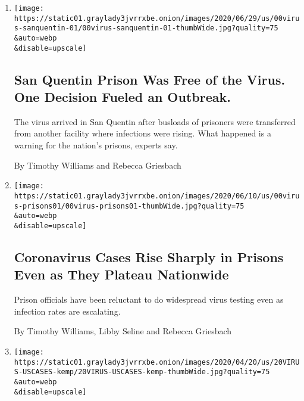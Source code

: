 \begin{enumerate}
\def\labelenumi{\arabic{enumi}.}
\item
  \href{/2020/06/30/us/san-quentin-prison-coronavirus.html}{}

  \texttt{[image: https://static01.graylady3jvrrxbe.onion/images/2020/06/29/us/00virus-sanquentin-01/00virus-sanquentin-01-thumbWide.jpg?quality=75\\\&auto=webp\\\&disable=upscale]}

  \hypertarget{san-quentin-prison-was-free-of-the-virus-one-decision-fueled-an-outbreak}{%
  \subsection{San Quentin Prison Was Free of the Virus. One Decision
  Fueled an
  Outbreak.}\label{san-quentin-prison-was-free-of-the-virus-one-decision-fueled-an-outbreak}}

  The virus arrived in San Quentin after busloads of prisoners were
  transferred from another facility where infections were rising. What
  happened is a warning for the nation's prisons, experts say.

  By Timothy Williams and Rebecca Griesbach
\item
  \href{/2020/06/16/us/coronavirus-inmates-prisons-jails.html}{}

  \texttt{[image: https://static01.graylady3jvrrxbe.onion/images/2020/06/10/us/00virus-prisons01/00virus-prisons01-thumbWide.jpg?quality=75\\\&auto=webp\\\&disable=upscale]}

  \hypertarget{coronavirus-cases-rise-sharply-in-prisons-even-as-they-plateau-nationwide}{%
  \subsection{Coronavirus Cases Rise Sharply in Prisons Even as They
  Plateau
  Nationwide}\label{coronavirus-cases-rise-sharply-in-prisons-even-as-they-plateau-nationwide}}

  Prison officials have been reluctant to do widespread virus testing
  even as infection rates are escalating.

  By Timothy Williams, Libby Seline and Rebecca Griesbach
\item
  \href{/2020/04/20/us/coronavirus-us-hot-spots-reopening.html}{}

  \texttt{[image: https://static01.graylady3jvrrxbe.onion/images/2020/04/20/us/20VIRUS-USCASES-kemp/20VIRUS-USCASES-kemp-thumbWide.jpg?quality=75\\\&auto=webp\\\&disable=upscale]}


\end{enumerate}

